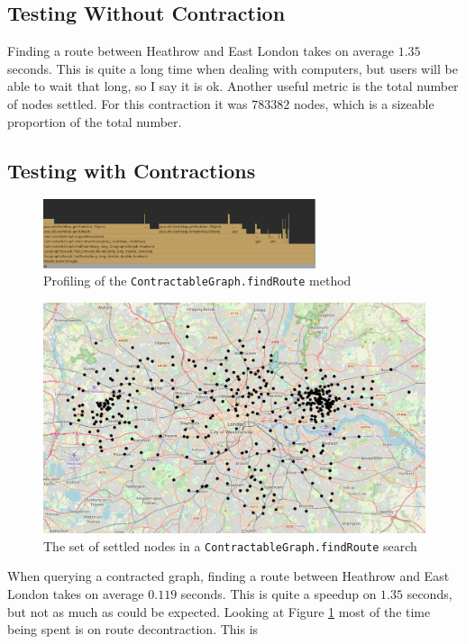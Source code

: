 \documentclass[11pt,twoside,a4paper]{report}
\begin{document}
\subsection{Testing Without Contraction}
Finding a route between Heathrow and East London takes on average $1.35$ seconds. This is quite a long time when dealing with computers, but users will be able to wait that long, so I say it is ok.
Another useful metric is the total number of nodes settled. For this contraction it was $783382$ nodes, which is a sizeable proportion of the total number.
\subsection{Testing with Contractions}
\begin{figure}[t]
    \begin{center}
\includegraphics[width=8cm]{profiling.png}
    \end{center}
    \caption{Profiling of the \texttt{ContractableGraph.findRoute} method}
    \label{profiling}
\end{figure}
\begin{figure}[t]
    \begin{center}
        \includegraphics[width=12cm]{settled.png}
    \end{center}
    \caption{The set of settled nodes in a \texttt{ContractableGraph.findRoute} search}
    \label{settled}
\end{figure}
When querying a contracted graph, finding a route between Heathrow and East London takes on average $0.119$ seconds. This is quite a speedup on $1.35$ seconds, but not as much as could be expected. Looking at Figure \ref{profiling} most of the time being spent is on route decontraction. This is
\end{document}
